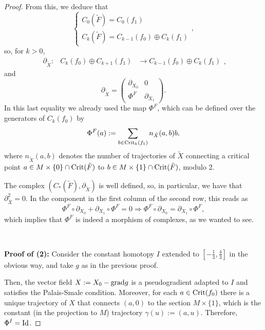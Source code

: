 \begin{proof}
From this, we deduce that
\begin{displaymath}
\left\{ \begin{array}{l} C_0(\tilde{F}) = C_0(f_1) \\ C_k(\tilde{F}) = C_{k-1}(f_0) \oplus C_k(f_1) \end{array} \right. ,
\end{displaymath}
so, for $k > 0$,
\begin{displaymath}
\begin{array}{rccc} \partial_{\tilde{X}} : & C_k(f_0) \oplus C_{k+1}(f_1) & \longrightarrow C_{k-1}(f_0) \oplus C_k(f_1) \end{array} ,
\end{displaymath}
and
\begin{displaymath}
\partial_{\tilde{X}} =
\begin{pmatrix}
\partial_{X_0} & 0 \\
\Phi^F & \partial_{X_1}
\end{pmatrix} .
\end{displaymath}
In this last equality we already used the map $\Phi^F$, which can be defined over the generators of $C_k(f_0)$ by
\begin{equation}\label{defmorphism}
\Phi^F(a) := \sum_{b \in \mathrm{Crit}_k(f_1)} n_{\tilde{X}}(a,b) b ,
\end{equation}
where $n_{\tilde{X}}(a,b)$ denotes the number of trajectories of $\tilde{X}$ connecting a critical point $a \in M \times \{0\} \cap \mathrm{Crit}(\tilde{F})$ to $b \in M \times \{1\} \cap \mathrm{Crit}(\tilde{F})$, modulo 2.

The complex $\left(C_{\ast}(\tilde{F}),\partial_{\tilde{X}}\right)$ is well defined, so, in particular, we have that $\partial_{\tilde{X}}^2 = 0$. In the component in the first column of the second row, this reads as
\begin{displaymath}
\Phi^F \circ \partial_{X_0} + \partial_{X_1} \circ \Phi^F = 0 \Rightarrow \Phi^F \circ \partial_{X_0} = \partial_{X_1} \circ \Phi^F ,
\end{displaymath}
which implies that $\Phi^F$ is indeed a morphism of complexes, as we wanted to see.

\

{\bf Proof of (2):} Consider the constant homotopy $I$ extended to $\left[-\frac13, \frac43\right]$ in the obvious way, and take $g$ as in the previous proof.

Then, the vector field $X := X_0 - \mathrm{grad} g$ is a pseudogradient adapted to $I$ and satisfies the Palais-Smale condition. Moreover, for each $a \in \mathrm{Crit}(f_0)$ there is a unique trajectory of $X$ that connects $(a,0)$ to the section $M \times \{1\}$, which is the constant (in the projection to $M$) trajectory $\gamma(u) := (a,u)$. Therefore, $\Phi^I = \mathrm{Id}$.


\end{proof}
